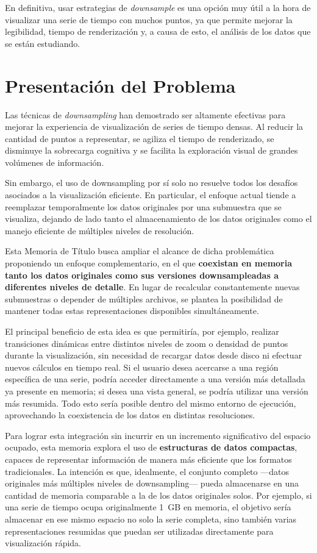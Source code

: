 En definitiva, usar estrategias de \textit{downsample} es una opción muy útil a la hora de visualizar una serie de tiempo con muchos puntos, ya que permite mejorar la legibilidad, tiempo de renderización y, a causa de esto, el análisis de los datos que se están estudiando.

\section{Presentación del Problema}

Las técnicas de \textit{downsampling} han demostrado ser altamente efectivas para mejorar la experiencia de visualización de series de tiempo densas. Al reducir la cantidad de puntos a representar, se agiliza el tiempo de renderizado, se disminuye la sobrecarga cognitiva y se facilita la exploración visual de grandes volúmenes de información.

Sin embargo, el uso de downsampling por sí solo no resuelve todos los desafíos asociados a la visualización eficiente. En particular, el enfoque actual tiende a reemplazar temporalmente los datos originales por una submuestra que se visualiza, dejando de lado tanto el almacenamiento de los datos originales como el manejo eficiente de múltiples niveles de resolución.

Esta Memoria de Título busca ampliar el alcance de dicha problemática proponiendo un enfoque complementario, en el que \textbf{coexistan en memoria tanto los datos originales como sus versiones downsampleadas a diferentes niveles de detalle}. En lugar de recalcular constantemente nuevas submuestras o depender de múltiples archivos, se plantea la posibilidad de mantener todas estas representaciones disponibles simultáneamente.

El principal beneficio de esta idea es que permitiría, por ejemplo, realizar transiciones dinámicas entre distintos niveles de zoom o densidad de puntos durante la visualización, sin necesidad de recargar datos desde disco ni efectuar nuevos cálculos en tiempo real. Si el usuario desea acercarse a una región específica de una serie, podría acceder directamente a una versión más detallada ya presente en memoria; si desea una vista general, se podría utilizar una versión más resumida. Todo esto sería posible dentro del mismo entorno de ejecución, aprovechando la coexistencia de los datos en distintas resoluciones.

Para lograr esta integración sin incurrir en un incremento significativo del espacio ocupado, esta memoria explora el uso de \textbf{estructuras de datos compactas}, capaces de representar información de manera más eficiente que los formatos tradicionales. La intención es que, idealmente, el conjunto completo —datos originales más múltiples niveles de downsampling— pueda almacenarse en una cantidad de memoria comparable a la de los datos originales solos. Por ejemplo, si una serie de tiempo ocupa originalmente 1~GB en memoria, el objetivo sería almacenar en ese mismo espacio no solo la serie completa, sino también varias representaciones resumidas que puedan ser utilizadas directamente para visualización rápida.

